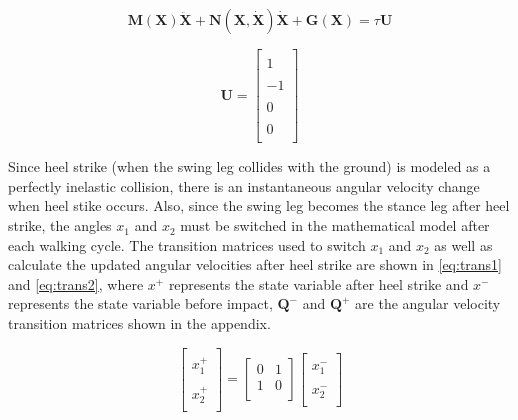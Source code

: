 \documentclass{./springer/svjour3}
\newcommand{\mb}[1]{\mathbf{#1}}
\begin{document}
\begin{equation}
\label{eq:swingeqn}
\mb{M(X)}\mb{\ddot{X}} + \mb{N(X, \dot{X})}\mb{\dot{X}} + \mb{G(X)} = \tau\mb{U}
\end{equation}

\begin{equation}
\label{eq:U}
\mb{U} = 
\begin{bmatrix}
\\1\\
\\-1\\
\\0\\
\\0\\
\end{bmatrix}
\end{equation}

Since heel strike (when the swing leg collides with the ground) is modeled as a perfectly inelastic 
collision, there is an instantaneous angular velocity change when heel stike occurs. Also, since the swing leg becomes the stance leg
after heel strike, the angles $x_1$ and $x_2$ must be switched in the mathematical model after each walking cycle. The transition matrices used to switch $x_1$ and $x_2$ as well 
as calculate the updated angular velocities after heel strike are shown in \ref{eq:trans1} and \ref{eq:trans2}, where $x^+$ represents the state
variable after heel strike and $x^-$ represents the state variable before impact, $\mb{Q^-}$ and $\mb{Q^+}$ are the angular velocity transition matrices shown in the appendix.

\begin{equation}
\label{eq:trans1}
\begin{bmatrix}
\\x_1^+\\
\\x_2^+\\
\end{bmatrix}
 = 
\begin{bmatrix}
0 & 1\\
1 & 0\\
\end{bmatrix}
\begin{bmatrix}
\\x_1^-\\
\\x_2^-\\
\end{bmatrix}
\end{equation}
\end{document}
